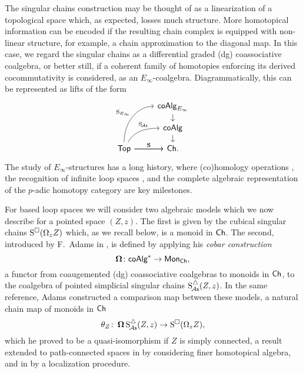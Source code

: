 The singular chains construction may be thought of as a linearization of a topological space which, as expected, losses much structure.
More homotopical information can be encoded if the resulting chain complex is equipped with non-linear structure, for example, a chain approximation to the diagonal map.
In this case, we regard the singular chains as a differential graded (dg) coassociative coalgebra, or better still, if a coherent family of homotopies enforcing its derived cocommutativity is considered, as an $E_\infty$-coalgebra.
Diagrammatically, this can be represented as lifts of the form
\begin{equation}
\begin{tikzcd}[column sep=normal, row sep=small]
& \coAlg_{E_\infty} \arrow[d] \\
& \coAlg \arrow[d] \\
\Top \arrow[uur, "\Schains_{E_\infty}", out=90, in=180] \arrow[r, "\Schains"]
\arrow[ur, "\SchainsA", out=60, in=180, near end]
\arrow[r, "\Schains"]
& \Ch.
\end{tikzcd}
\end{equation}
The study of $E_\infty$-structures has a long history, where (co)homology operations \cite{steenrod1962cohomology, may1970general}, the recognition of infinite loop spaces \cite{boardman1973homotopy, may1972geometry}, and the complete algebraic representation of the $p$-adic homotopy category \cite{mandell2001padic} are key milestones.

For based loop spaces we will consider two algebraic models which we now describe for a pointed space $(Z, z)$.
The first is given by the cubical singular chains $\operatorname{S^{\square}}(\Omega_z Z)$ which, as we recall below, is a monoid in $\mathsf{Ch}$.
The second, introduced by F.~Adams in \cite{adams1956cobar}, is defined by applying his \textit{cobar construction}
\[
\operatorname{\mathbf{\Omega}} \colon \mathsf{coAlg}^\ast \to \mathsf{Mon}_{\mathsf{Ch}},
\]
a functor from coaugemented (dg) coassociative coalgebras to monoids in $\mathsf{Ch}$, to the coalgebra of pointed simplicial singular chains $\operatorname{S^{\triangle}_{\!{\mathcal{A}\mathsf{s}}}}(Z,z)$.
In the same reference, Adams constructed a comparison map between these models, a natural chain map of monoids in $\mathsf{Ch}$
\begin{equation} \label{e:adams map}
\theta_Z \colon \operatorname{\mathbf{\Omega}} \operatorname{S^{\triangle}_{\!{\mathcal{A}\mathsf{s}}}}(Z,z) \to \operatorname{S^{\square}}(\Omega_z Z),
\end{equation}
which he proved to be a quasi-isomorphism if $Z$ is simply connected, a result extended to path-connected spaces in \cite{rivera2018cubical} by considering finer homotopical algebra, and in \cite{hess2010cobar} by a localization procedure.

